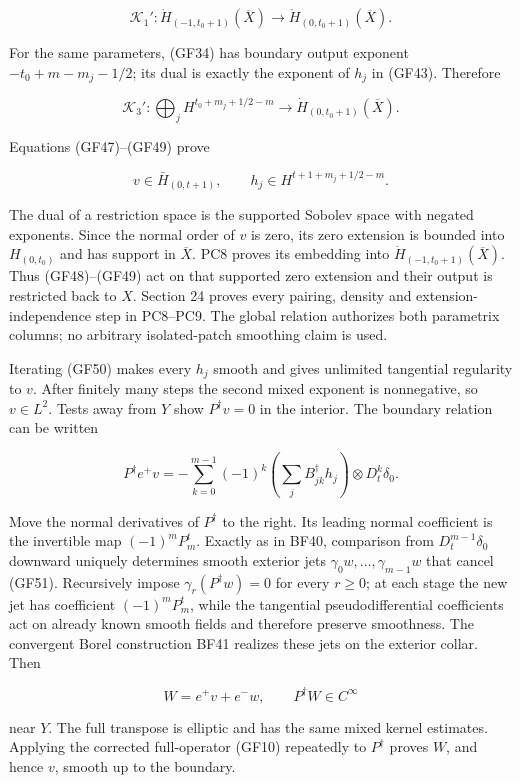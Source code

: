 \documentclass[
  11pt,
]{article}
\begin{document}
\[
 \mathscr K_1':\dot H_{(-1,t_{\!0}+1)}(\overline X)\longrightarrow \dot H_{(0,t_{\!0}+1)}(\overline X).
 \tag{GF48}
\]

For the same parameters, (GF34) has boundary output exponent
\(-t_{\!0}+m-m_j-1/2\); its dual is exactly the exponent of \(h_j\) in
(GF43). Therefore

\[
 \mathscr K_3':
 \bigoplus_jH^{t_{\!0}+m_j+1/2-m}
 \longrightarrow \dot H_{(0,t_{\!0}+1)}(\overline X).
 \tag{GF49}
\]

Equations (GF47)--(GF49) prove

\[
 v\in\bar H_{(0,t+1)},
 \qquad
 h_j\in H^{t+1+m_j+1/2-m}.
 \tag{GF50}
\]

The dual of a restriction space is the supported Sobolev space with
negated exponents. Since the normal order of \(v\) is zero, its zero
extension is bounded into \(H_{(0,t_{\!0})}\) and has support in
\(\overline X\). PC8 proves its embedding into
\(\dot H_{(-1,t_{\!0}+1)}(\overline X)\). Thus (GF48)--(GF49) act on
that supported zero extension and their output is restricted back to
\(X\). Section 24 proves every pairing, density and
extension-independence step in PC8--PC9. The global relation authorizes
both parametrix columns; no arbitrary isolated-patch smoothing claim is
used.

Iterating (GF50) makes every \(h_j\) smooth and gives unlimited
tangential regularity to \(v\). After finitely many steps the second
mixed exponent is nonnegative, so \(v\in L^2\). Tests away from \(Y\)
show \(P^\dagger v=0\) in the interior. The boundary relation can be
written

\[
 P^\dagger e^+v
 =-\sum_{k=0}^{m-1}(-1)^k
   \left(\sum_jB_{jk}^\dagger h_j\right)\otimes D_t^k\delta_0.
 \tag{GF51}
\]

Move the normal derivatives of \(P^\dagger\) to the right. Its leading
normal coefficient is the invertible map \((-1)^mP_m^t\). Exactly as in
BF40, comparison from \(D_t^{m-1}\delta_0\) downward uniquely determines
smooth exterior jets \(\gamma_0w,\ldots,\gamma_{m-1}w\) that cancel
(GF51). Recursively impose \(\gamma_r(P^\dagger w)=0\) for every
\(r\geq0\); at each stage the new jet has coefficient \((-1)^mP_m^t\),
while the tangential pseudodifferential coefficients act on already
known smooth fields and therefore preserve smoothness. The convergent
Borel construction BF41 realizes these jets on the exterior collar. Then

\[
 W=e^+v+e^-w,
 \qquad P^\dagger W\in C^\infty
 \tag{GF52}
\]

near \(Y\). The full transpose is elliptic and has the same mixed kernel
estimates. Applying the corrected full-operator (GF10) repeatedly to
\(P^\dagger\) proves \(W\), and hence \(v\), smooth up to the boundary.
\end{document}
